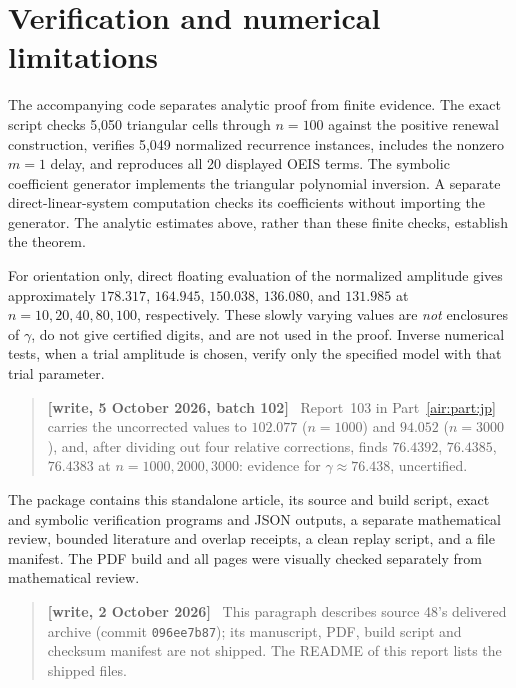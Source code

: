 \documentclass[11pt,letterpaper]{article}
\numberwithin{equation}{section}
\theoremstyle{remark}
\newenvironment{writenote}{\par\smallskip\begin{quote}\small\textbf{[write, 2 October 2026]}\ }{\end{quote}\smallskip}
\newenvironment{writenotejp}{\par\smallskip\begin{quote}\small\textbf{[write, 5 October 2026, batch 102]}\ }{\end{quote}\smallskip}
\begin{document}
\section{Verification and numerical limitations}
The accompanying code separates analytic proof from finite evidence.
The exact script checks 5,050 triangular cells through $n=100$ against
the positive renewal construction, verifies 5,049 normalized recurrence
instances, includes the nonzero $m=1$ delay, and reproduces all 20 displayed
OEIS terms. The symbolic coefficient generator implements the triangular
polynomial inversion. A separate direct-linear-system computation checks
its coefficients without importing the generator. The analytic estimates
above, rather than these finite checks, establish the theorem.

For orientation only, direct floating evaluation of the normalized
amplitude gives approximately $178.317$, $164.945$, $150.038$, $136.080$,
and $131.985$ at $n=10,20,40,80,100$, respectively. These slowly varying
values are \emph{not} enclosures of $\gamma$, do not give certified digits,
and are not used in the proof. Inverse numerical tests, when a trial
amplitude is chosen, verify only the specified model with that trial
parameter.
\begin{writenotejp}
Report~103 in Part~\ref{air:part:jp} carries the uncorrected values to $102.077$ ($n=1000$) and $94.052$ ($n=3000$), and, after dividing out four relative corrections, finds $76.4392$, $76.4385$, $76.4383$ at $n=1000,2000,3000$: evidence for $\gamma\approx76.438$, uncertified.
\end{writenotejp}

The package contains this standalone article, its source and build script,
exact and symbolic verification programs and JSON outputs, a separate
mathematical review, bounded literature and overlap receipts, a clean
replay script, and a file manifest. The PDF build and all pages were
visually checked separately from mathematical review.
\begin{writenote}
This paragraph describes source 48's delivered archive (commit \texttt{096ee7b87}); its manuscript, PDF, build script and checksum manifest are not shipped. The README of this report lists the shipped files.
\end{writenote}
\end{document}
